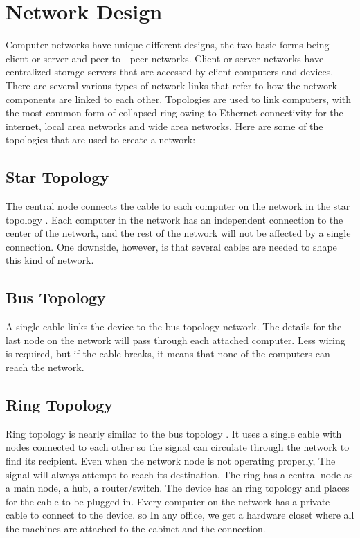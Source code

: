 \documentclass[12pt]{article}
\begin{document}
\section{Network Design}
Computer networks have unique different designs, the two basic forms being client or server and peer-to - peer networks. Client or server networks have centralized storage servers that are accessed by client computers and devices.
There are several various types of network links that refer to how the network components are linked to each other. Topologies are used to link computers, with the most common form of collapsed ring owing to Ethernet connectivity for the internet, local area networks and wide area networks. 
Here are some of the topologies that are used to create a network:
\subsection{Star Topology}
The central node connects the cable to each computer on the network in the star topology .   Each computer in the network has an independent connection to the center of the network, and the rest of the network will not be affected by a single connection. One downside, however, is that several cables are needed to shape this kind of network.
\subsection{Bus Topology}


A single cable links the device to the bus topology network. The details for the last node on the network will pass through each attached computer. Less wiring is required, but if the cable breaks, it means that none of the computers can reach the network.
\subsection{Ring Topology}

Ring topology is nearly similar to the bus topology . It uses a single cable with nodes connected to each other so the signal can circulate through the network to find its recipient. Even when the network node is not operating properly, The signal will always attempt to reach its destination. The ring has a central node as a main node, a hub, a router/switch. The device has an ring topology and places for the cable to be plugged in. Every computer on the network has a private cable to connect to the device. so In any office, we get a hardware closet where all the machines are attached to the cabinet and the connection. \cite{6}
\end{document}
